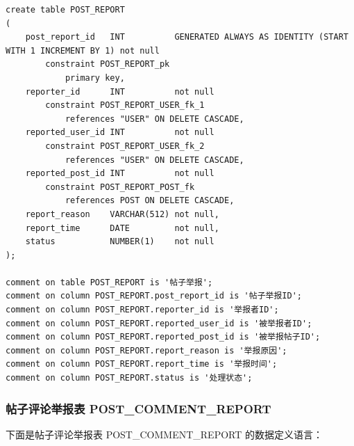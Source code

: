 \begin{verbatim}
create table POST_REPORT
(
    post_report_id   INT          GENERATED ALWAYS AS IDENTITY (START WITH 1 INCREMENT BY 1) not null
        constraint POST_REPORT_pk
            primary key,
    reporter_id      INT          not null
        constraint POST_REPORT_USER_fk_1
            references "USER" ON DELETE CASCADE,
    reported_user_id INT          not null
        constraint POST_REPORT_USER_fk_2
            references "USER" ON DELETE CASCADE,
    reported_post_id INT          not null
        constraint POST_REPORT_POST_fk
            references POST ON DELETE CASCADE,
    report_reason    VARCHAR(512) not null,
    report_time      DATE         not null,
    status           NUMBER(1)    not null
);

comment on table POST_REPORT is '帖子举报';
comment on column POST_REPORT.post_report_id is '帖子举报ID';
comment on column POST_REPORT.reporter_id is '举报者ID';
comment on column POST_REPORT.reported_user_id is '被举报者ID';
comment on column POST_REPORT.reported_post_id is '被举报帖子ID';
comment on column POST_REPORT.report_reason is '举报原因';
comment on column POST_REPORT.report_time is '举报时间';
comment on column POST_REPORT.status is '处理状态';
\end{verbatim}

\subsubsection{帖子评论举报表 POST\_COMMENT\_REPORT}

下面是帖子评论举报表 POST\_COMMENT\_REPORT 的数据定义语言：

